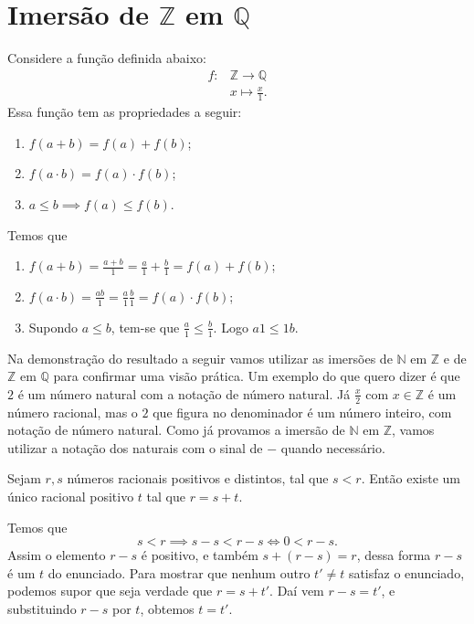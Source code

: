 \documentclass[../main.tex]{subfiles}
\begin{document}
\section{Imersão de $\mathbb{Z}$ em $\mathbb{Q}$}
\begin{teo}\label{rac-teo-imersao}
    Considere a função definida abaixo:
    \begin{align*}
        f \colon &\mathbb{Z} \rightarrow \mathbb{Q} \\
            & x \mapsto \frac{x}{1}.
    \end{align*}
    Essa função tem as propriedades a seguir:
    \begin{enumerate}[label=(\roman*)]
        \item $f(a + b) = f(a) + f(b)$;
        \item $f(a \cdot b) = f(a) \cdot f(b)$;
        \item $a \leq b \implies f(a) \leq f(b)$.
    \end{enumerate}
\end{teo}
\begin{dem}
    Temos que 
    \begin{enumerate}[label=(\roman*)]
        \item $f(a + b) = \frac{a+b}{1} = \frac{a}{1} + \frac{b}{1} = f(a) + f(b)$;
        \item $f(a \cdot b) = \frac{ab}{1} = \frac{a}{1} \frac{b}{1} = f(a) \cdot f(b)$;
        \item Supondo $a \leq b$, tem-se que $\frac{a}{1} \leq \frac{b}{1} $. Logo $ a1 \leq 1b$.
    \end{enumerate}
\end{dem}

Na demonstração do resultado a seguir vamos utilizar as imersões de $\mathbb{N}$ em $\mathbb{Z}$ e de $\mathbb{Z}$ em $\mathbb{Q}$ para confirmar uma visão prática. Um exemplo do que quero dizer é que $2$ é um número natural com a notação de número natural. Já $\frac{x}{2}$ com $x \in \mathbb{Z}$ é um número racional, mas o $2$ que figura no denominador é um número inteiro, com notação de número natural. Como já provamos a imersão de $\mathbb{N}$ em $\mathbb{Z}$, vamos utilizar a notação dos naturais com o sinal de $-$ quando necessário.

\begin{prop}\label{rac-prop-diferencaPositiva}
    Sejam $r,s$ números racionais positivos e distintos, tal que $s < r$. Então existe um único racional positivo $t$ tal que  $r = s+t$.
\end{prop}
\begin{dem}
    Temos que 
    \[ s<r \implies s-s < r-s \iff 0 < r-s. \]
    Assim o elemento $r-s$ é positivo, e também $s+(r-s) = r$, dessa forma $r-s$ é um $t$ do enunciado. Para mostrar que nenhum outro $t' \neq t$ satisfaz o enunciado, podemos supor que seja verdade que $r=s+t'$. Daí vem $r-s=t'$, e substituindo $r-s$ por $t$, obtemos $t = t'$. 
\end{dem}
\end{document}
